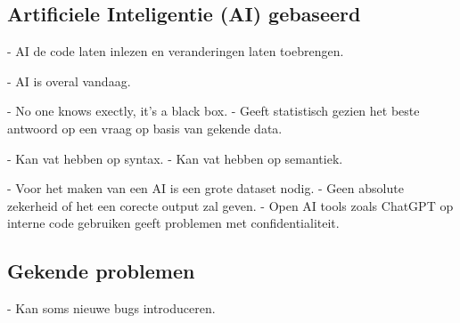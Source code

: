 \subsection{Artificiele Inteligentie (AI) gebaseerd}
\label{ch:stand-van-zaken:refactoring:ai}


- AI de code laten inlezen en veranderingen laten toebrengen.


- AI is overal vandaag.


- No one knows exectly, it's a black box.
- Geeft statistisch gezien het beste antwoord op een vraag op basis van gekende data.


- Kan vat hebben op syntax.
- Kan vat hebben op semantiek.


- Voor het maken van een AI is een grote dataset nodig.
- Geen absolute zekerheid of het een corecte output zal geven.
- Open AI tools zoals ChatGPT op interne code gebruiken geeft problemen met confidentialiteit.

\subsection{Gekende problemen}
\label{ch:stand-van-zaken:refactoring:known-problems}


- Kan soms nieuwe bugs introduceren.









